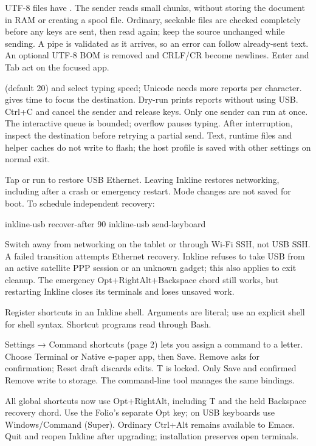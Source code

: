 \UsbExamples

UTF-8 files have . The sender reads small chunks,
without storing the document in RAM or creating a spool file. Ordinary,
seekable files are checked completely before any keys are sent, then read
again; keep the source unchanged while sending. A pipe is validated as it
arrives, so an error can follow already-sent text. An optional UTF-8 BOM is
removed and CRLF/CR become newlines. Enter and Tab act on the focused app.

 (default 20) and  select typing speed;
Unicode needs more reports per character.  gives time
to focus the destination. Dry-run prints reports without using USB.
Ctrl+C and  cancel the sender and release keys. Only one sender
can run at once. The interactive queue is bounded; overflow pauses typing.
After interruption, inspect the destination before retrying a partial send.
Text, runtime files and helper caches do not write to flash; the host profile
is saved with other settings on normal exit.

Tap  or run  to restore USB Ethernet.
Leaving Inkline restores networking, including after a crash or emergency
restart. Mode changes are not saved for boot. To schedule independent recovery:
\begin{shell}
inkline-usb recover-after 90
inkline-usb send-keyboard
\end{shell}
Switch away from networking on the tablet or through Wi-Fi SSH, not USB SSH.
A failed transition attempts Ethernet recovery. Inkline refuses to take USB
from an active satellite PPP session or an unknown gadget; this also applies
to exit cleanup. The emergency Opt+RightAlt+Backspace chord still works,
but restarting Inkline closes its terminals and loses unsaved work.

Register shortcuts in an Inkline shell. Arguments are literal; use an explicit
shell for shell syntax. Shortcut programs read  through Bash.

Settings → Command shortcuts (page 2) lets you assign a command to a letter. Choose Terminal or Native e-paper app, then Save. Remove asks for confirmation; Reset draft discards edits. T is locked. Only Save and confirmed Remove write to storage. The command-line tool manages the same bindings.

All global shortcuts now use Opt+RightAlt, including T and the held Backspace recovery chord. Use the Folio’s separate Opt key; on USB keyboards use Windows/Command (Super). Ordinary Ctrl+Alt remains available to Emacs. Quit and reopen Inkline after upgrading; installation preserves open terminals.

